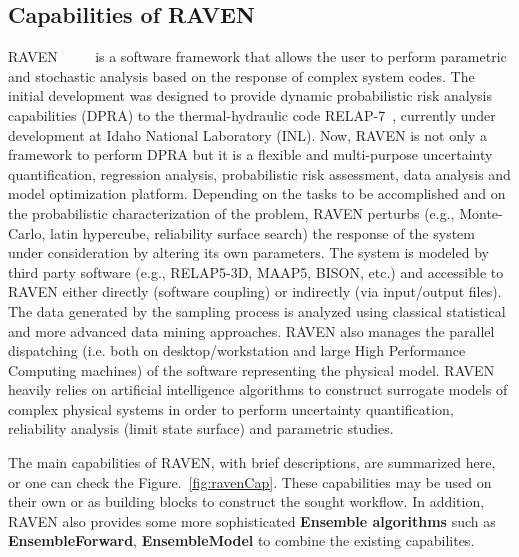 

\subsection{Capabilities of RAVEN}
RAVEN~\cite{alfonsiMC} ~\cite{alfonsiPSA}~\cite{RAVENFY13}~\cite{ESREL2014} is a software framework that allows the user to perform parametric and stochastic
analysis based on the response of complex system codes.
The initial development was designed to provide dynamic probabilistic risk analysis
capabilities (DPRA) to the thermal-hydraulic code RELAP-7~\cite{relap7FY12}, currently under development
at Idaho National Laboratory (INL).
Now, RAVEN is not only a framework to perform DPRA but it is a flexible and
multi-purpose uncertainty quantification, regression analysis, probabilistic risk assessment, data analysis and
model optimization platform. Depending on the tasks to be accomplished and on the probabilistic characterization
of the problem, RAVEN perturbs (e.g., Monte-Carlo, latin hypercube, reliability surface search) the response of
the system under consideration by altering its own parameters. The system is modeled by third party software
(e.g., RELAP5-3D, MAAP5, BISON, etc.) and accessible to RAVEN either directly (software coupling) or indirectly
(via input/output files). The data generated by the sampling process is analyzed using classical statistical
and more advanced data mining approaches. RAVEN also manages the parallel dispatching
(i.e. both on desktop/workstation and large High Performance Computing machines) of the software representing the
physical model. RAVEN heavily relies on artificial intelligence algorithms to construct surrogate models of
complex physical systems in order to perform uncertainty quantification, reliability analysis (limit state surface)
and parametric studies.

The main capabilities of RAVEN, with brief descriptions, are summarized here, or one can check the Figure.~\ref{fig:ravenCap}.
These capabilities may be used on their own or as building blocks to construct the sought workflow. In addition, RAVEN also provides some more sophisticated
\textbf{Ensemble algorithms} such as \textbf{EnsembleForward}, \textbf{EnsembleModel} to combine the existing
capabilites.

